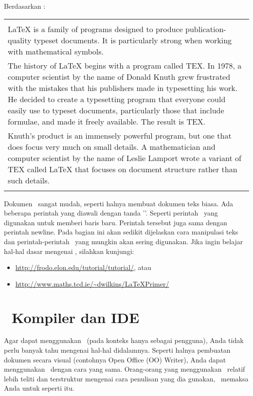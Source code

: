 Berdasarkan \cite{latex.intro}: \\ 
\begin{tabular}{| p{13cm} |}
	\hline 
	\\
	LaTeX is a family of programs designed to produce publication-quality 
	typeset documents. It is particularly strong when working with 
	mathematical symbols. \\	
	The history of LaTeX begins with a program called TEX. In 1978, a 
	computer scientist by the name of Donald Knuth grew frustrated with the 
	mistakes that his publishers made in typesetting his work. He decided 
	to create a typesetting program that everyone could easily use to 
	typeset documents, particularly those that include formulae, and made 
	it freely available. The result is TEX. \\	
	Knuth's product is an immensely powerful program, but one that does 
	focus very much on small details. A mathematician and computer 
	scientist by the name of Leslie Lamport wrote a variant of TEX called 
	LaTeX that focuses on document structure rather than such details. \\
	\\
	\hline
\end{tabular}

\vspace*{0.8cm}

Dokumen \latex~sangat mudah, seperti halnya membuat dokumen teks biasa. Ada 
beberapa perintah yang diawali dengan tanda '\bslash'. 
Seperti perintah \bslash\bslash~yang digunakan untuk memberi baris baru. 
Perintah tersebut juga sama dengan perintah \bslash newline. 
Pada bagian ini akan sedikit dijelaskan cara manipulasi teks dan 
perintah-perintah \latex~yang mungkin akan sering digunakan. 
Jika ingin belajar hal-hal dasar mengenai \latex, silahkan kunjungi: 

\begin{itemize}
	\item \url{http://frodo.elon.edu/tutorial/tutorial/}, atau
	\item \url{http://www.maths.tcd.ie/~dwilkins/LaTeXPrimer/}
\end{itemize}


\section{\latex~Kompiler dan IDE}
Agar dapat menggunakan \latex~(pada konteks hanya sebagai pengguna), Anda 
tidak perlu banyak tahu mengenai hal-hal didalamnya. 
Seperti halnya pembuatan dokumen secara visual (contohnya Open Office (OO) 
Writer), Anda dapat menggunakan \latex~dengan cara yang sama. 
Orang-orang yang menggunakan \latex~relatif lebih teliti dan terstruktur 
mengenai cara penulisan yang dia gunakan, \latex~memaksa Anda untuk seperti 
itu.  

